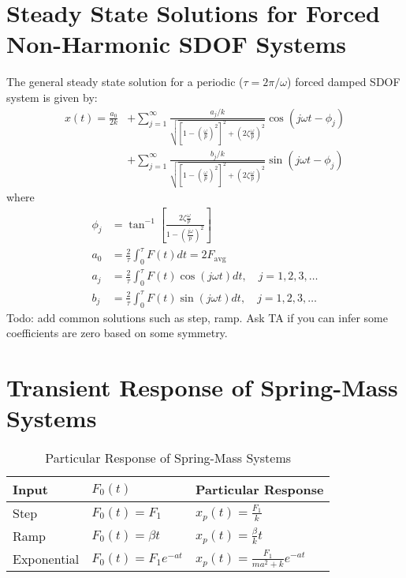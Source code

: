 \section{Steady State Solutions for Forced Non-Harmonic SDOF Systems}
The general steady state solution for a periodic ($\tau = 2\pi/\omega$) forced damped SDOF system is given by:
\begin{align*}
    x(t) = \frac{a_0}{2k} &+ \sum_{j = 1}^{\infty} \frac{a_j/k}{\sqrt{\left[1 - \left(\frac{\omega}{p}\right)^2\right]^2 + \left(2\zeta\frac{\omega}{p}\right)^2}}\cos(j\omega t - \phi_j) \\
    &+ \sum_{j = 1}^{\infty} \frac{b_j/k}{\sqrt{\left[1 - \left(\frac{\omega}{p}\right)^2\right]^2 + \left(2\zeta\frac{\omega}{p}\right)^2}}\sin(j\omega t - \phi_j)
\end{align*}
where
\begin{align*}
    \phi_j &= \tan^{-1} \left[\frac{2\zeta\frac{\omega}{p}}{1 - \left(\frac{j \omega}{p}\right)^2}\right]\\
    a_0 &= \frac{2}{\tau} \int_0^{\tau} F(t) dt = 2 F_{\text{avg}} \\
    a_j &= \frac{2}{\tau} \int_0^{\tau} F(t) \cos(j\omega t) dt, \quad j = 1, 2, 3, \ldots \\
    b_j &= \frac{2}{\tau} \int_0^{\tau} F(t) \sin(j\omega t) dt, \quad j = 1, 2, 3, \ldots
\end{align*}
Todo:
add common solutions such as step, ramp. Ask TA if you can infer some coefficients are zero based on some symmetry.

\section{Transient Response of Spring-Mass Systems}
\begin{table}[H]
    \centering
    \caption{Particular Response of Spring-Mass Systems}
    \begin{tabular}{lll}
        \toprule
        Input & $F_0(t)$ & Particular Response \\
        \midrule
        Step & $F_0(t) = F_1$ & $\displaystyle x_p(t) = \frac{F_1}{k}$ \\[2ex]
        Ramp & $F_0(t) = \beta t$ & $\displaystyle x_p(t) = \frac{\beta}{k}t$ \\[2ex]
        Exponential & $F_0(t) = F_1 e^{-at}$ & $\displaystyle x_p(t) = \frac{F_1}{ma^2 + k} e^{-at}$ \\
        \bottomrule
        \end{tabular}
\end{table}

